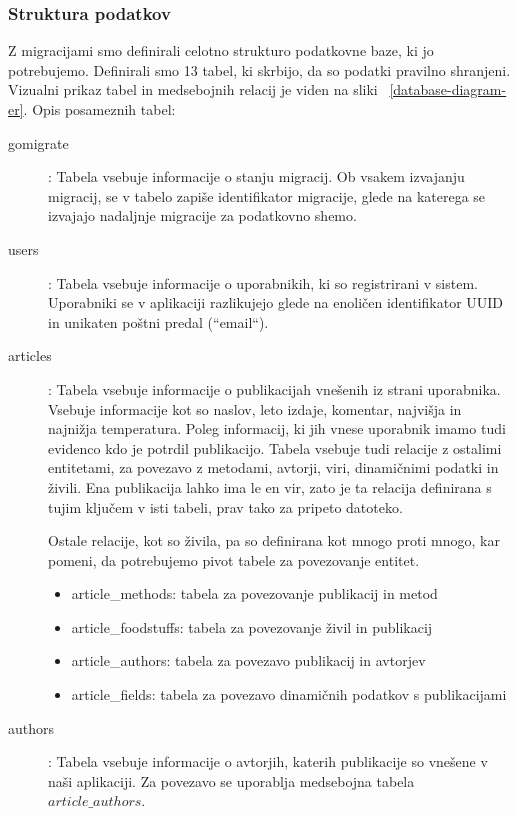 \documentclass[a4paper, 12pt]{book}
\begin{document}
\subsubsection{ Struktura podatkov }
Z migracijami smo definirali celotno strukturo podatkovne baze, ki jo potrebujemo. Definirali smo 13 tabel, ki skrbijo, da so podatki pravilno shranjeni. Vizualni prikaz tabel in medsebojnih relacij je viden na sliki ~\ref{database-diagram-er}. Opis posameznih tabel:
\begin{description}
\item[gomigrate]: Tabela vsebuje informacije o stanju migracij. Ob vsakem izvajanju migracij, se v tabelo zapiše identifikator migracije, glede na katerega se izvajajo nadaljnje migracije za podatkovno shemo. 

\item[users]: Tabela vsebuje informacije o uporabnikih, ki so registrirani v sistem. Uporabniki se v aplikaciji razlikujejo glede na enoličen identifikator UUID in unikaten poštni predal (``email``). 

\item[articles]: Tabela vsebuje informacije o publikacijah vnešenih iz strani uporabnika. Vsebuje informacije kot so naslov, leto izdaje, komentar, najvišja in najnižja temperatura. Poleg informacij, ki jih vnese uporabnik imamo tudi evidenco kdo je potrdil publikacijo. Tabela vsebuje tudi relacije z ostalimi entitetami, za povezavo z metodami, avtorji, viri, dinamičnimi podatki in živili. Ena publikacija lahko ima le en vir, zato je ta relacija definirana s tujim ključem v isti tabeli, prav tako za pripeto datoteko. 

Ostale relacije, kot so živila, pa so definirana kot mnogo proti mnogo, kar pomeni, da potrebujemo pivot tabele za povezovanje entitet.
\begin{itemize}
    \item article\_methods: tabela za povezovanje publikacij in metod
    \item article\_foodstuffs: tabela za povezovanje živil in publikacij
    \item article\_authors: tabela za povezavo publikacij in avtorjev
    \item article\_fields: tabela za povezavo dinamičnih podatkov s publikacijami
\end{itemize}

\item[authors]: Tabela vsebuje informacije o avtorjih, katerih publikacije so vnešene v naši aplikaciji. Za povezavo se uporablja medsebojna tabela $article\_authors$.


\end{description}
\end{document}
